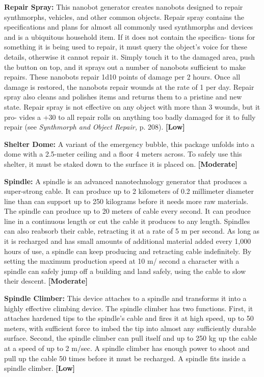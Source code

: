 \textbf{Repair Spray: }This nanobot generator creates 
nanobots designed to repair synthmorphs, vehicles, 
and other common objects. Repair spray contains 
the specifications and plans for almost all commonly 
used synthmorphs and devices and is a ubiquitous 
household item. If it does not contain the specifica-
tions for something it is being used to repair, it must 
query the object's voice for these details, otherwise 
it cannot repair it. Simply touch it to the damaged 
area, push the button on top, and it sprays out a 
number of nanobots sufficient to make repairs. 
These nanobots repair 1d10 points of damage per 
2 hours. Once all damage is restored, the nanobots 
repair wounds at the rate of 1 per day. Repair spray 
also cleans and polishes items and returns them to a 
pristine and new state. Repair spray is not effective 
on any object with more than 3 wounds, but it pro-
vides a +30 to all repair rolls on anything too badly 
damaged for it to fully repair (see \textit{Synthmorph and }
\textit{Object Repair,} p. 208). \textbf{[Low]}

\textbf{Shelter Dome:} A variant of the emergency bubble, 
this package unfolds into a dome with a 2.5-meter 
ceiling and a floor 4 meters across. To safely use this 
shelter, it must be staked down to the surface it is 
placed on. \textbf{[Moderate]}

\textbf{Spindle: }A spindle is an advanced nanotechnology 
generator that produces a super-strong cable. It can 
produce up to 2 kilometers of 0.2 millimeter diameter 
line than can support up to 250 kilograms before it 
needs more raw materials. The spindle can produce 
up to 20 meters of cable every second. It can produce 
line in a continuous length or cut the cable it produces 
to any length. Spindles can also reabsorb their cable, 
retracting it at a rate of 5 m per second. As long as 
it is recharged and has small amounts of additional 
material added every 1,000 hours of use, a spindle 
can keep producing and retracting cable indefinitely. 
By setting the maximum production speed at 10 m/
second a character with a spindle can safely jump 
off a building and land safely, using the cable to slow 
their descent. \textbf{[Moderate]}

\textbf{Spindle Climber:} This device attaches to a spindle 
and transforms it into a highly effective climbing 
device. The spindle climber has two functions. First, it 
attaches hardened tips to the spindle's cable and fires 
it at high speed, up to 50 meters, with sufficient force 
to imbed the tip into almost any sufficiently durable 
surface. Second, the spindle climber can pull itself and 
up to 250 kg up the cable at a speed of up to 2 m/sec. 
A spindle climber has enough power to shoot and pull 
up the cable 50 times before it must be recharged. A 
spindle fits inside a spindle climber. \textbf{[Low]}

